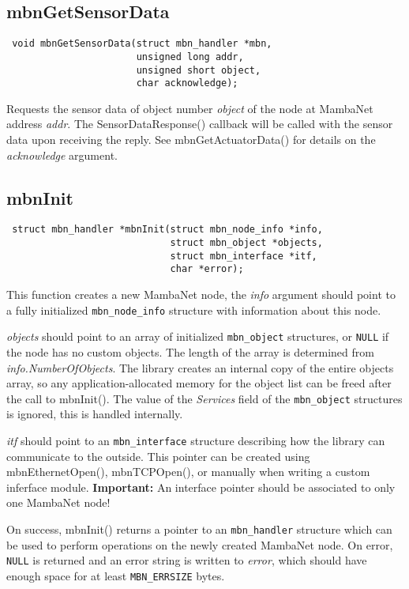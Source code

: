 \subsection{mbnGetSensorData}
\begin{verbatim}
 void mbnGetSensorData(struct mbn_handler *mbn,
                       unsigned long addr,
                       unsigned short object,
                       char acknowledge);
\end{verbatim}
Requests the sensor data of object number \textit{object} of the node at MambaNet address \textit{addr}. The SensorDataResponse() callback will be called with the sensor data upon receiving the reply. See mbnGetActuatorData() for details on the \textit{acknowledge} argument.


\subsection{mbnInit}
\begin{verbatim}
 struct mbn_handler *mbnInit(struct mbn_node_info *info,
                             struct mbn_object *objects,
                             struct mbn_interface *itf,
                             char *error);
\end{verbatim}
This function creates a new MambaNet node, the \textit{info} argument should point to a fully initialized \verb|mbn_node_info| structure with information about this node.

\textit{objects} should point to an array of initialized \verb|mbn_object| structures, or \verb|NULL| if the node has no custom objects. The length of the array is determined from \textit{info.NumberOfObjects}. The library creates an internal copy of the entire objects array, so any application-allocated memory for the object list can be freed after the call to mbnInit(). The value of the \textit{Services} field of the \verb|mbn_object| structures is ignored, this is handled internally.

\textit{itf} should point to an \verb|mbn_interface| structure describing how the library can communicate to the outside. This pointer can be created using mbnEthernetOpen(), mbnTCPOpen(), or manually when writing a custom inferface module. \textbf{Important:} An interface pointer should be associated to only one MambaNet node!

On success, mbnInit() returns a pointer to an \verb|mbn_handler| structure which can be used to perform operations on the newly created MambaNet node. On error, \verb|NULL| is returned and an error string is written to \textit{error}, which should have enough space for at least \verb|MBN_ERRSIZE| bytes.


